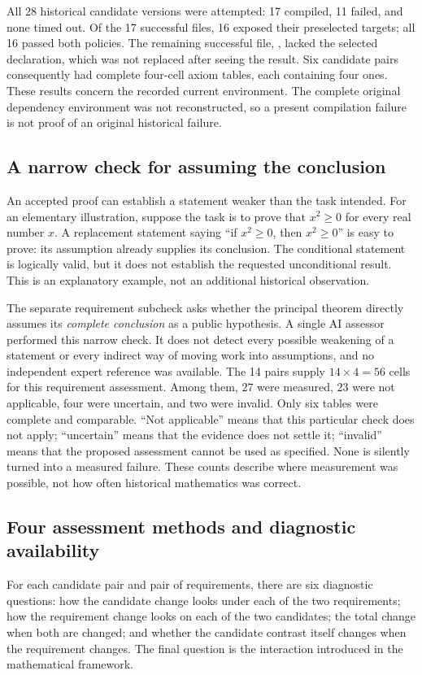 All 28 historical candidate versions were attempted: 17 compiled, 11 failed, and none timed out. Of the 17 successful files, 16 exposed their preselected targets; all 16 passed both policies. The remaining successful file, , lacked the selected declaration, which was not replaced after seeing the result. Six candidate pairs consequently had complete four-cell axiom tables, each containing four ones. These results concern the recorded current environment. The complete original dependency environment was not reconstructed, so a present compilation failure is not proof of an original historical failure.

\subsection{A narrow check for assuming the conclusion}
\label{subsec:assumed-conclusion}
An accepted proof can establish a statement weaker than the task intended. For an elementary illustration, suppose the task is to prove that $x^2\geq 0$ for every real number $x$. A replacement statement saying ``if $x^2\geq 0$, then $x^2\geq 0$'' is easy to prove: its assumption already supplies its conclusion. The conditional statement is logically valid, but it does not establish the requested unconditional result. This is an explanatory example, not an additional historical observation.

The separate requirement subcheck asks whether the principal theorem directly assumes its \emph{complete conclusion} as a public hypothesis. A single AI assessor performed this narrow check. It does not detect every possible weakening of a statement or every indirect way of moving work into assumptions, and no independent expert reference was available. The 14 pairs supply $14\times4=56$ cells for this requirement assessment. Among them, 27 were measured, 23 were not applicable, four were uncertain, and two were invalid. Only six tables were complete and comparable. ``Not applicable'' means that this particular check does not apply; ``uncertain'' means that the evidence does not settle it; ``invalid'' means that the proposed assessment cannot be used as specified. None is silently turned into a measured failure. These counts describe where measurement was possible, not how often historical mathematics was correct.

\subsection{Four assessment methods and diagnostic availability}
\label{subsec:diagnostics}
For each candidate pair and pair of requirements, there are six diagnostic questions: how the candidate change looks under each of the two requirements; how the requirement change looks on each of the two candidates; the total change when both are changed; and whether the candidate contrast itself changes when the requirement changes. The final question is the interaction introduced in the mathematical framework.

